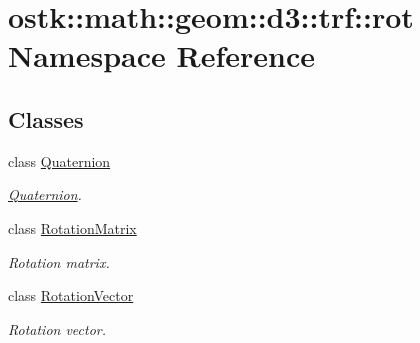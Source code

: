 \hypertarget{namespaceostk_1_1math_1_1geom_1_1d3_1_1trf_1_1rot}{}\section{ostk\+:\+:math\+:\+:geom\+:\+:d3\+:\+:trf\+:\+:rot Namespace Reference}
\label{namespaceostk_1_1math_1_1geom_1_1d3_1_1trf_1_1rot}
\subsection*{Classes}
\begin{DoxyCompactItemize}
\item 
class \hyperlink{classostk_1_1math_1_1geom_1_1d3_1_1trf_1_1rot_1_1_quaternion}{Quaternion}
\begin{DoxyCompactList}\small\item\em \hyperlink{classostk_1_1math_1_1geom_1_1d3_1_1trf_1_1rot_1_1_quaternion}{Quaternion}. \end{DoxyCompactList}\item 
class \hyperlink{classostk_1_1math_1_1geom_1_1d3_1_1trf_1_1rot_1_1_rotation_matrix}{Rotation\+Matrix}
\begin{DoxyCompactList}\small\item\em Rotation matrix. \end{DoxyCompactList}\item 
class \hyperlink{classostk_1_1math_1_1geom_1_1d3_1_1trf_1_1rot_1_1_rotation_vector}{Rotation\+Vector}
\begin{DoxyCompactList}\small\item\em Rotation vector. \end{DoxyCompactList}\end{DoxyCompactItemize}
